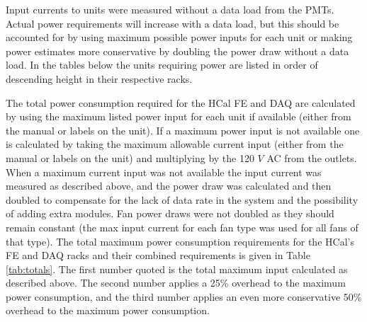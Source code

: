 \documentclass[10pt]{article}
\begin{document}
\noindent Input currents to units were measured without a data load from the PMTs. Actual power requirements will increase with a data load, but this should be accounted for by using maximum possible power inputs for each unit or making power estimates more conservative by doubling the power draw without a data load. In the tables below the units requiring power are listed in order of descending height in their respective racks. 
\vspace{3mm}

The total power consumption required for the HCal FE and DAQ are calculated by using the maximum listed power input for each unit if available (either from the manual or labels on the unit). If a maximum power input is not available one is calculated by taking the maximum allowable current input (either from the manual or labels on the unit) and multiplying by the 120 $V$ AC from the outlets. When a maximum current input was not available the input current was measured as described above, and the power draw was calculated and then doubled to compensate for the lack of data rate in the system and the possibility of adding extra modules. Fan power draws were not doubled as they should remain constant (the max input current for each fan type was used for all fans of that type). The total maximum power consumption requirements for the HCal's FE and DAQ racks and their combined requirements is given in Table \ref{tab:totals}. The first number quoted is the total maximum input calculated as described above. The second number applies a 25\% overhead to the maximum power consumption, and the third number applies an even more conservative 50\% overhead to the maximum power consumption.
\end{document}
